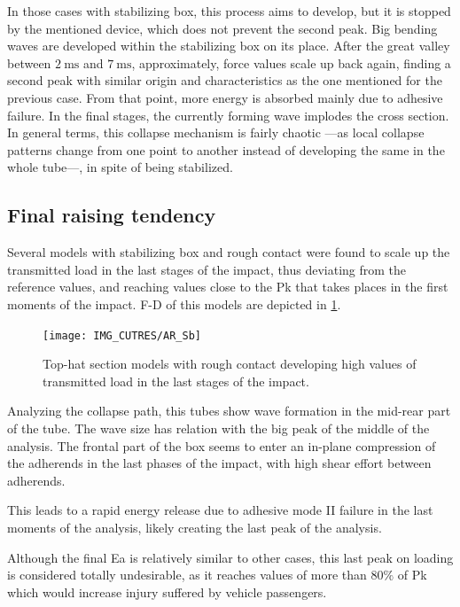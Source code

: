 \documentclass[cmfonts]{witpress}
\begin{document}
In those cases with stabilizing box, this process aims to develop, but it is stopped by the mentioned device, which does not prevent the second peak. Big bending waves are developed within the stabilizing box on its place. After the great valley between $\SI{2}{\ms}$ and $\SI{7}{\ms}$, approximately, force values scale up back again, finding a second peak with similar origin and characteristics as the one mentioned for the previous case. From that point, more energy is absorbed mainly due to adhesive failure. In the final stages, the currently forming wave implodes the cross section. In general terms, this collapse mechanism is fairly chaotic ---as local collapse patterns change from one point to another instead of developing the same in the whole tube---, in spite of being stabilized.

\subsection{Final raising tendency}
\label{sec:final_tendency}

Several models with stabilizing box and rough contact were found to scale up the transmitted load in the last stages of the impact, thus deviating from the reference values, and reaching values close to the Pk that takes places in the first moments of the impact. F-D of this models are depicted in \cref{fig:AR_Sb}.

\begin{figure}
	\centering
	\texttt{[image: IMG\_CUTRES/AR\_Sb]}
	\caption{Top-hat section models with rough contact developing high values of transmitted load in the last stages of the impact.}
	\label{fig:AR_Sb}
\end{figure}

Analyzing the collapse path, this tubes show wave formation in the mid-rear part of the tube. The wave size has relation with the big peak of the middle of the analysis. The frontal part of the box seems to enter an in-plane compression of the adherends in the last phases of the impact, with high shear effort between adherends.

This leads to a rapid energy release due to adhesive mode II failure in the last moments of the analysis, likely creating the last peak of the analysis.

Although the final Ea is relatively similar to other cases, this last peak on loading is considered totally undesirable, as it reaches values of more than $80\%$ of Pk which would increase injury suffered by vehicle passengers.
\end{document}
